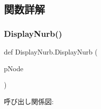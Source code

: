 \subsection{関数詳解}
\mbox{\label{namespace_display_nurb_ac2e0d6539d92bec45881cb3e1161de28}} 
\subsubsection{\texorpdfstring{Display\+Nurb()}{DisplayNurb()}}
{\footnotesize\ttfamily def Display\+Nurb.\+Display\+Nurb (\begin{DoxyParamCaption}\item[{}]{p\+Node }\end{DoxyParamCaption})}

呼び出し関係図\+:
